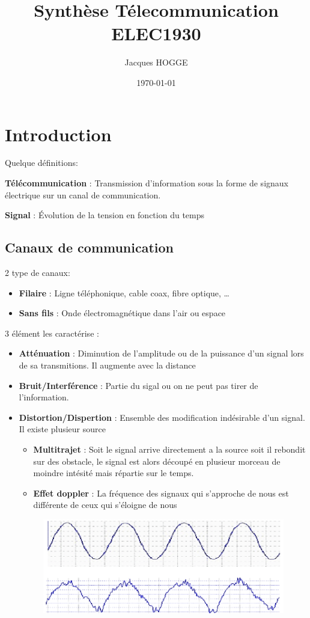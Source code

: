 \documentclass[12pt]{article}
\title{Synthèse Télecommunication ELEC1930}
\author{Jacques HOGGE}
\date{\today}
\begin{document}
\maketitle
\newpage
\tableofcontents
\newpage
\section{Introduction}
Quelque définitions:

\textbf{Télécommunication} : Transmission d'information sous la forme de signaux électrique sur un canal de communication.

\textbf{Signal} : Évolution de la tension en fonction du temps

	\subsection{Canaux de communication}
		2 type de canaux:
		\begin{itemize}
			\item \textbf{Filaire} : Ligne téléphonique, cable coax, fibre optique, \dots
			\item \textbf{Sans fils} : Onde électromagnétique dans l'air ou espace
		\end{itemize}
		
		3 élément les caractérise :
		\begin{itemize}
			\item \textbf{Atténuation} : Diminution de l'amplitude ou de la puissance d'un signal lors de sa transmitions. Il augmente avec la distance
			\item \textbf{Bruit/Interférence} : Partie du sigal ou on ne peut pas tirer de l'information.
			\item  \textbf{Distortion/Dispertion} : Ensemble des modification indésirable d'un signal. Il existe plusieur source
			\begin{itemize}
				\item \textbf{Multitrajet} : Soit le signal arrive directement a la source soit il rebondit sur des obstacle, le signal est alors découpé en plusieur morceau de moindre intésité mais répartie sur le temps.
				\item \textbf{Effet doppler} : La fréquence des signaux qui s'approche de nous est  différente de ceux qui s'éloigne de nous
			\end{itemize}
			
			\begin{figure}[htp]
				\centering
				\includegraphics[width=\textwidth]{img/Distortion.png}
			\end{figure}
		\end{itemize}
	
\end{document}
